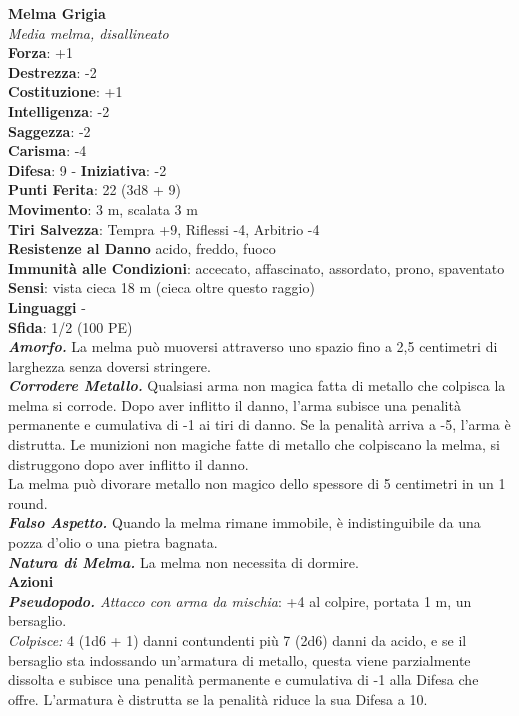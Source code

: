 \begin{multicols}{2}
\medskip\textbf{Melma Grigia}\\
\emph{Media melma, disallineato}\\
\textbf{Forza}: +1\\
\textbf{Destrezza}: -2\\
\textbf{Costituzione}: +1\\
\textbf{Intelligenza}: -2\\
\textbf{Saggezza}: -2\\
\textbf{Carisma}: -4\\
\textbf{Difesa}: 9 - \textbf{Iniziativa}: -2\\
\textbf{Punti Ferita}: 22 (3d8 + 9)\\
\textbf{Movimento}: 3 m, scalata 3 m\\
\textbf{Tiri Salvezza}: Tempra +9, Riflessi -4, Arbitrio -4\\
\textbf{Resistenze al Danno} acido, freddo, fuoco\\
\textbf{Immunità alle Condizioni}: accecato, affascinato, assordato, prono, spaventato
\textbf{Sensi}: vista cieca 18 m (cieca oltre questo raggio)\\
\textbf{Linguaggi} -\\
\textbf{Sfida}: 1/2 (100 PE)\smallskip\\
\emph{\textbf{Amorfo.}} La melma può muoversi attraverso uno spazio fino a 2,5 centimetri di larghezza senza doversi stringere.\\
\emph{\textbf{Corrodere Metallo.}} Qualsiasi arma non magica fatta di metallo che colpisca la melma si corrode. Dopo aver inflitto il danno, l'arma subisce una penalità permanente e cumulativa di -1 ai tiri di danno. Se la penalità arriva a -5, l'arma è distrutta. Le munizioni non magiche fatte di metallo che colpiscano la melma, si distruggono dopo aver inflitto il danno.\\
La melma può divorare metallo non magico dello spessore di 5 centimetri in un 1 round.\\
\emph{\textbf{Falso Aspetto.}} Quando la melma rimane immobile, è indistinguibile da una pozza d'olio o una pietra bagnata.\\
\emph{\textbf{Natura di Melma.}} La melma non necessita di dormire. \\
\smallskip\textbf{Azioni}\\
\emph{\textbf{Pseudopodo.} Attacco con arma da mischia}: +4 al colpire, portata 1 m, un bersaglio.\\
\emph{Colpisce:} 4 (1d6 + 1) danni contundenti più 7 (2d6) danni da acido, e se il bersaglio sta indossando un'armatura di metallo, questa viene parzialmente dissolta e subisce una penalità permanente e cumulativa di -1 alla Difesa che offre. L'armatura è distrutta se la penalità riduce la sua Difesa a 10.\\

\end{multicols}
